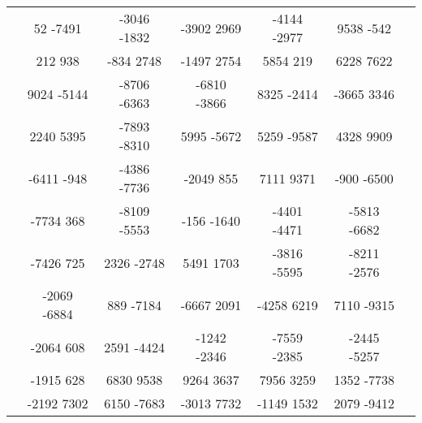 \begin{landscape}
\begin{table}[]
\begin{tabular}{|c|ccccc|c|}
				 & 52 -7491 & -3046 -1832 & -3902 2969 & -4144 -2977 & 9538 -542 & 		 \\
				 & 212 938 & -834 2748 & -1497 2754 & 5854 219 & 6228 7622 & 		 \\
				 & 9024 -5144 & -8706 -6363 & -6810 -3866 & 8325 -2414 & -3665 3346 & 		 \\
				 & 2240 5395 & -7893 -8310 & 5995 -5672 & 5259 -9587 & 4328 9909 & 		 \\
				 & -6411 -948 & -4386 -7736 & -2049 855 & 7111 9371 & -900 -6500 & 		 \\
				 & -7734 368 & -8109 -5553 & -156 -1640 & -4401 -4471 & -5813 -6682 & 		 \\
				 & -7426 725 & 2326 -2748 & 5491 1703 & -3816 -5595 & -8211 -2576 & 		 \\
				 & -2069 -6884 & 889 -7184 & -6667 2091 & -4258 6219 & 7110 -9315 & 		 \\
				 & -2064 608 & 2591 -4424 & -1242 -2346 & -7559 -2385 & -2445 -5257 & 		 \\
				 & -1915 628 & 6830 9538 & 9264 3637 & 7956 3259 & 1352 -7738 & 		 \\
				 & -2192 7302 & 6150 -7683 & -3013 7732 & -1149 1532 & 2079 -9412 & 		 \\ \hline
		\end{tabular}
	\end{table}
\end {landscape}
